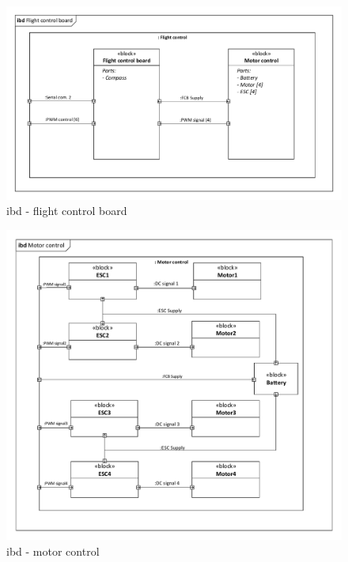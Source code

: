 \begin{figure}[H]
\centering
\includegraphics[width=1\textwidth]{Billeder/IBD/ibd5_flightcontrolboard.pdf}
\caption{ibd - flight control board}
\label{fig:ibd_flightcontrolboard}
\end{figure}

\begin{figure}[H]
\centering
\includegraphics[width=1\textwidth]{Billeder/IBD/ibd6_motorcontrol.pdf}
\caption{ibd - motor control}
\label{fig:ibd_motorcontrol}
\end{figure}

